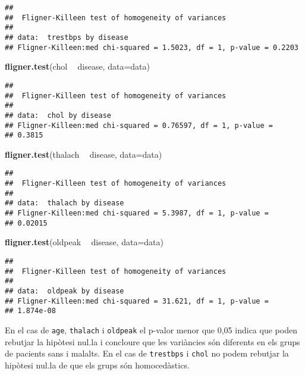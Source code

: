 \documentclass[12,]{article}
\newenvironment{Shaded}{\begin{snugshade}}{\end{snugshade}}
\newcommand{\DataTypeTok}[1]{\textcolor[rgb]{0.13,0.29,0.53}{#1}}
\newcommand{\KeywordTok}[1]{\textcolor[rgb]{0.13,0.29,0.53}{\textbf{#1}}}
\newcommand{\NormalTok}[1]{#1}
\newcommand{\OperatorTok}[1]{\textcolor[rgb]{0.81,0.36,0.00}{\textbf{#1}}}
\newcommand{\StringTok}[1]{\textcolor[rgb]{0.31,0.60,0.02}{#1}}
\begin{document}
\begin{verbatim}
## 
##  Fligner-Killeen test of homogeneity of variances
## 
## data:  trestbps by disease
## Fligner-Killeen:med chi-squared = 1.5023, df = 1, p-value = 0.2203
\end{verbatim}

\begin{Shaded}
\begin{Highlighting}[]
\KeywordTok{fligner.test}\NormalTok{(chol }\OperatorTok{~}\StringTok{ }\NormalTok{disease, }\DataTypeTok{data=}\NormalTok{data)}
\end{Highlighting}
\end{Shaded}

\begin{verbatim}
## 
##  Fligner-Killeen test of homogeneity of variances
## 
## data:  chol by disease
## Fligner-Killeen:med chi-squared = 0.76597, df = 1, p-value =
## 0.3815
\end{verbatim}

\begin{Shaded}
\begin{Highlighting}[]
\KeywordTok{fligner.test}\NormalTok{(thalach }\OperatorTok{~}\StringTok{ }\NormalTok{disease, }\DataTypeTok{data=}\NormalTok{data)}
\end{Highlighting}
\end{Shaded}

\begin{verbatim}
## 
##  Fligner-Killeen test of homogeneity of variances
## 
## data:  thalach by disease
## Fligner-Killeen:med chi-squared = 5.3987, df = 1, p-value =
## 0.02015
\end{verbatim}

\begin{Shaded}
\begin{Highlighting}[]
\KeywordTok{fligner.test}\NormalTok{(oldpeak }\OperatorTok{~}\StringTok{ }\NormalTok{disease, }\DataTypeTok{data=}\NormalTok{data)}
\end{Highlighting}
\end{Shaded}

\begin{verbatim}
## 
##  Fligner-Killeen test of homogeneity of variances
## 
## data:  oldpeak by disease
## Fligner-Killeen:med chi-squared = 31.621, df = 1, p-value =
## 1.874e-08
\end{verbatim}

En el cas de \texttt{age}, \texttt{thalach} i \texttt{oldpeak} el
p-valor menor que 0,05 indica que poden rebutjar la hipòtesi nul.la i
concloure que les variàncies són diferents en els grups de pacients sans
i malalts. En el cas de \texttt{trestbps} i \texttt{chol} no podem
rebutjar la hipòtesi nul.la de que els grups són homocedàstics.
\end{document}
